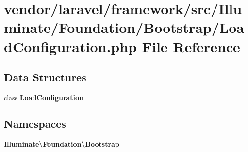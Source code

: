 \section{vendor/laravel/framework/src/\+Illuminate/\+Foundation/\+Bootstrap/\+Load\+Configuration.php File Reference}
\label{_load_configuration_8php}
\subsection*{Data Structures}
\begin{DoxyCompactItemize}
\item 
class {\bf Load\+Configuration}
\end{DoxyCompactItemize}
\subsection*{Namespaces}
\begin{DoxyCompactItemize}
\item 
 {\bf Illuminate\textbackslash{}\+Foundation\textbackslash{}\+Bootstrap}
\end{DoxyCompactItemize}
